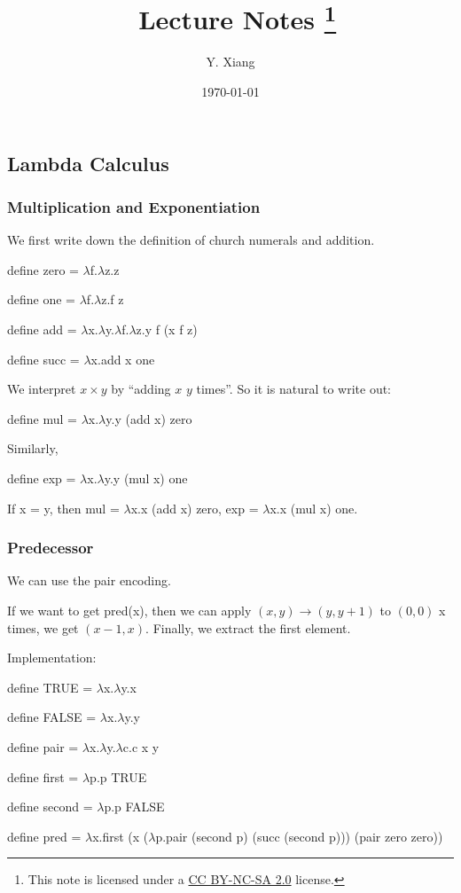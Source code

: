 \documentclass{article}
\title{\vspace{-3em}\course\, Lecture Notes \asnum\footnote{This note is licensed under a \href{https://creativecommons.org/licenses/by-nc-sa/2.0/}{CC BY-NC-SA 2.0} license.}}
\author{Y. Xiang\vspace{1em}}
\date{\today\vspace{-1em}}
\theoremstyle{definition}
\newcommand{\lb}{$\lambda$}
\begin{document}
\maketitle
\subsection{Lambda Calculus}

\subsubsection*{Multiplication and Exponentiation}
We first write down the definition of church numerals and addition.

\begin{tcolorbox}
    \textsf{define} zero = \lb f.\lb z.z

    \textsf{define} one = \lb f.\lb z.f z

    \textsf{define} add = \lb x.\lb y.\lb f.\lb z.y f (x f z)

    \textsf{define} succ = \lb x.add x one
\end{tcolorbox}

We interpret $x\times y$ by ``adding $x$ $y$ times''. So it is natural to write out:

\begin{tcolorbox}
    \textsf{define} mul = \lb x.\lb y.y (add x) zero
\end{tcolorbox}

Similarly,

\begin{tcolorbox}
    \textsf{define} exp = \lb x.\lb y.y (mul x) one
\end{tcolorbox}

If x = y, then mul = \lb x.x (add x) zero, exp = \lb x.x (mul x) one.

\subsubsection*{Predecessor}

We can use the \textsf{pair} encoding.

If we want to get \textsf{pred}(x), then we can apply $(x, y) \rightarrow (y, y+1)$ to $(0, 0)$ x times, we get $(x-1,x)$.
Finally, we extract the first element.

Implementation:

\begin{tcolorbox}
    \textsf{define} TRUE = \lb x.\lb y.x

    \textsf{define} FALSE = \lb x.\lb y.y

    \textsf{define} pair = \lb x.\lb y.\lb c.c x y

    \textsf{define} first = \lb p.p TRUE

    \textsf{define} second = \lb p.p FALSE

    \textsf{define} pred = \lb x.first (x (\lb p.pair (second p) (succ (second p))) (pair zero zero))
\end{tcolorbox}
\end{document}
